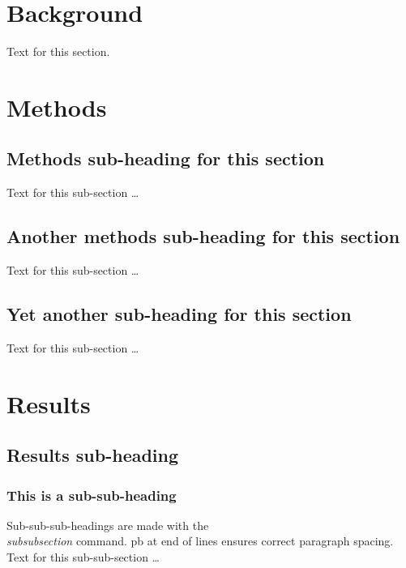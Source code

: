 \documentclass[10pt]{bmc_article}
\newenvironment{bmcformat}{\begin{raggedright}\baselineskip20pt\sloppy\setboolean{publ}{false}}{\end{raggedright}\baselineskip20pt\sloppy}
\begin{document}
\begin{bmcformat}
\section*{Background}
 Text for this section.\cite{koon,oreg,khar,zvai,xjon,schn,pond,smith,marg,hunn,advi,koha,mouse}



\section*{Methods}
  \subsection*{Methods sub-heading for this section}
    Text for this sub-section \ldots

  \subsection*{Another methods sub-heading for this section}
    Text for this sub-section \ldots

  \subsection*{Yet another sub-heading for this section}
    Text for this sub-section \ldots


 

\section*{Results}
  \subsection*{Results sub-heading}
    \subsubsection*{This is a sub-sub-heading}
      Sub-sub-sub-headings are made with the \textsl{\\subsubsection} command. \pb
      pb at end of lines ensures correct paragraph spacing.\pb
	  Text for this sub-sub-section \ldots

\end{bmcformat}
\end{document}
